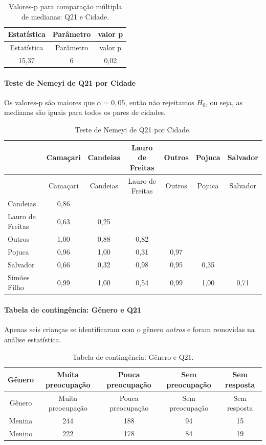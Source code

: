 \documentclass[]{article}
\let\oldparagraph\paragraph
\renewcommand{\paragraph}[1]{\oldparagraph{#1}\mbox{}}
\begin{document}
\begin{longtable}[]{@{}ccc@{}}
\caption{\label{tab:unnamed-chunk-331}Valores-p para comparação múltipla de medianas: Q21 e Cidade.}\tabularnewline
\toprule
Estatística & Parâmetro & valor p\tabularnewline
\midrule
\endfirsthead
\toprule
Estatística & Parâmetro & valor p\tabularnewline
\midrule
\endhead
15,37 & 6 & 0,02\tabularnewline
\bottomrule
\end{longtable}

\hypertarget{teste-de-nemeyi-de-q21-por-cidade}{%
\paragraph{Teste de Nemeyi de Q21 por Cidade}\label{teste-de-nemeyi-de-q21-por-cidade}}

Os valores-p são maiores que \(\alpha=0,05\), então não rejeitamos \(H_0\), ou seja, as medianas são iguais para todos os pares de cidades.

\begin{longtable}[]{@{}lcccccc@{}}
\caption{\label{tab:unnamed-chunk-332}Teste de Nemeyi de Q21 por Cidade.}\tabularnewline
\toprule
& Camaçari & Candeias & Lauro de Freitas & Outros & Pojuca & Salvador\tabularnewline
\midrule
\endfirsthead
\toprule
& Camaçari & Candeias & Lauro de Freitas & Outros & Pojuca & Salvador\tabularnewline
\midrule
\endhead
Candeias & 0,86 & & & & &\tabularnewline
Lauro de Freitas & 0,63 & 0,25 & & & &\tabularnewline
Outros & 1,00 & 0,88 & 0,82 & & &\tabularnewline
Pojuca & 0,96 & 1,00 & 0,31 & 0,97 & &\tabularnewline
Salvador & 0,66 & 0,32 & 0,98 & 0,95 & 0,35 &\tabularnewline
Simões Filho & 0,99 & 1,00 & 0,54 & 0,99 & 1,00 & 0,71\tabularnewline
\bottomrule
\end{longtable}

\cleardoublepage

\hypertarget{tabela-de-continguxeancia-guxeanero-e-q21}{%
\paragraph{Tabela de contingência: Gênero e Q21}\label{tabela-de-continguxeancia-guxeanero-e-q21}}

Apenas seis crianças se identificaram com o gênero \emph{outros} e foram removidas na análise estatística.

\begin{longtable}[]{@{}ccccc@{}}
\caption{\label{tab:unnamed-chunk-333}Tabela de contingência: Gênero e Q21.}\tabularnewline
\toprule
Gênero & Muita preocupação & Pouca preocupação & Sem preocupação & Sem resposta\tabularnewline
\midrule
\endfirsthead
\toprule
Gênero & Muita preocupação & Pouca preocupação & Sem preocupação & Sem resposta\tabularnewline
\midrule
\endhead
Menina & 244 & 188 & 94 & 15\tabularnewline
Menino & 222 & 178 & 84 & 19\tabularnewline
\bottomrule
\end{longtable}
\end{document}
